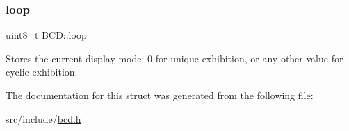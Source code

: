 \subsubsection{\texorpdfstring{loop}{loop}}
{\footnotesize\ttfamily uint8\+\_\+t B\+C\+D\+::loop}



Stores the current display mode\+: 0 for unique exhibition, or any other value for cyclic exhibition. 



The documentation for this struct was generated from the following file\+:\begin{DoxyCompactItemize}
\item 
src/include/\mbox{\hyperlink{bcd_8h}{bcd.\+h}}\end{DoxyCompactItemize}
